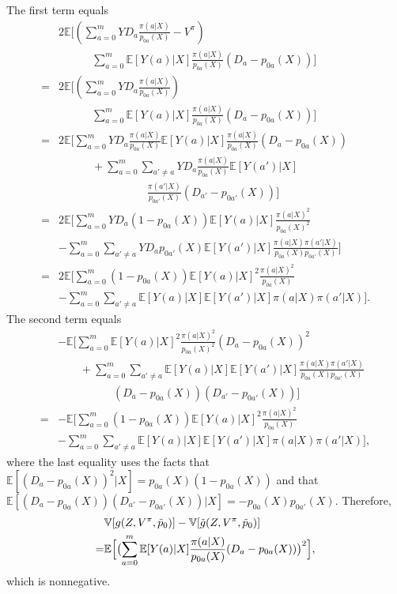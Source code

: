 \documentclass[letterpaper]{article} \usepackage{aaai19}  \usepackage{times}  \usepackage{helvet}  \usepackage{courier}  \usepackage{url}  \usepackage{graphicx}  \frenchspacing  \usepackage{comment}
\begin{document}
The first term equals
\begin{align*}
	&2\mathbb{E}\bigl[(\sum_{a=0}^m YD_{a}\frac{\pi(a|X)}{p_{0a}(X)}-V^{\pi})\\
	&\hspace{3em}\sum_{a=0}^m\mathbb{E}[Y(a)|X]\frac{\pi(a|X)}{p_{0a}(X)}(D_a-p_{0a}(X))\bigr]\\
	=&2\mathbb{E}\bigl[(\sum_{a=0}^m YD_{a}\frac{\pi(a|X)}{p_{0a}(X)})\\
	&\hspace{3em}\sum_{a=0}^m\mathbb{E}[Y(a)|X]\frac{\pi(a|X)}{p_{0a}(X)}(D_a-p_{0a}(X))\bigr]\\
	=&2\mathbb{E}\bigl[\sum_{a=0}^m YD_{a}\frac{\pi(a|X)}{p_{0a}(X)}\mathbb{E}[Y(a)|X]\frac{\pi(a|X)}{p_{0a}(X)}(D_a-p_{0a}(X))\\
	&\hspace{3em}+\sum_{a=0}^m\sum_{a'\neq a}YD_{a}\frac{\pi(a|X)}{p_{0a}(X)}\mathbb{E}[Y(a')|X]\\
	&\hspace{8em}\frac{\pi(a'|X)}{p_{0a'}(X)}(D_{a'}-p_{0a'}(X))\bigr]\\
	=&2\mathbb{E}\bigl[\sum_{a=0}^m YD_{a}(1-p_{0a}(X))\mathbb{E}[Y(a)|X]\frac{\pi(a|X)^2}{p_{0a}(X)^2}
	\\
	&-\sum_{a=0}^m\sum_{a'\neq a}YD_{a}p_{0a'}(X)\mathbb{E}[Y(a')|X]\frac{\pi(a|X)\pi(a'|X)}{p_{0a}(X)p_{0a'}(X)}\bigr]\\
	=&2\mathbb{E}\bigl[\sum_{a=0}^m (1-p_{0a}(X))\mathbb{E}[Y(a)|X]^2\frac{\pi(a|X)^2}{p_{0a}(X)}
	\\
	&-\sum_{a=0}^m\sum_{a'\neq a}\mathbb{E}[Y(a)|X]\mathbb{E}[Y(a')|X]\pi(a|X)\pi(a'|X)\bigr].
\end{align*}
The second term equals
\begin{align*}
	&-\mathbb{E}\bigl[\sum_{a=0}^m\mathbb{E}[Y(a)|X]^2\frac{\pi(a|X)^2}{p_{0a}(X)^2}(D_a-p_{0a}(X))^2\\
	&\hspace{2em}+\sum_{a=0}^m\sum_{a'\neq a}\mathbb{E}[Y(a)|X]\mathbb{E}[Y(a')|X]\frac{\pi(a|X)\pi(a'|X)}{p_{0a}(X)p_{0a'}(X)}\\
	&\hspace{5em}(D_a-p_{0a}(X))(D_{a'}-p_{0a'}(X))\bigr]\\
	=&-\mathbb{E}\bigl[\sum_{a=0}^m (1-p_{0a}(X))\mathbb{E}[Y(a)|X]^2\frac{\pi(a|X)^2}{p_{0a}(X)}
	\\
	&-\sum_{a=0}^m\sum_{a'\neq a}\mathbb{E}[Y(a)|X]\mathbb{E}[Y(a')|X]\pi(a|X)\pi(a'|X)\bigr],
\end{align*}
where the last equality uses the facts that $\mathbb{E}[(D_a-p_{0a}(X))^2|X]=p_{0a}(X)(1-p_{0a}(X))$ and that $\mathbb{E}[(D_a-p_{0a}(X))(D_{a'}-p_{0a'}(X))|X]=-p_{0a}(X)p_{0a'}(X)$.
Therefore,
\begin{align*}
	&\mathbb{V}[g(Z,V^{\pi},\tilde p_0)]-\mathbb{V}[\tilde g(Z,V^{\pi},\tilde p_0)]\\
	=&\mathbb{E}\Bigl[\bigl(\sum_{a=0}^m\mathbb{E}[Y(a)|X]\frac{\pi(a|X)}{p_{0a}(X)}(D_a-p_{0a}(X))\bigr)^2\Bigr],
\end{align*}
which is nonnegative.
\end{document}
